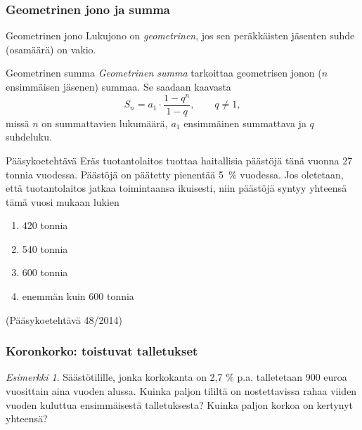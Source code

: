 \documentclass[handout]{beamer}\usepackage[]{graphicx}\usepackage[]{color}
\theoremstyle{remark}
\newtheorem{esim}{Esimerkki}
\begin{document}
\begin{frame}
    \frametitle{Geometrinen jono ja summa}
    \pause
    \begin{block}{Geometrinen jono}
        Lukujono on \emph{geometrinen}, jos sen peräkkäisten jäsenten suhde (osamäärä) on vakio.
    \end{block}
    \pause
    \begin{block}{Geometrinen summa}
        \emph{Geometrinen summa} tarkoittaa geometrisen jonon ($n$ ensimmäisen jäsenen) summaa. Se saadaan kaavasta
        \[
            S_n = a_1\cdot \frac{1-q^n}{1-q}, \qquad q\neq 1,
        \] \pause
        missä \(n\) on summattavien lukumäärä,
        \pause \(a_1\) ensimmäinen summattava
        \pause ja \(q\) suhdeluku.
    \end{block}
\end{frame}

\begin{frame}
  \begin{block}{Pääsykoetehtävä}
    Eräs tuotantolaitos tuottaa haitallisia päästöjä tänä vuonna 27 tonnia vuodessa.
Päästöjä on päätetty pienentää 5~\% vuodessa. Jos oletetaan, että tuotantolaitos jatkaa
toimintaansa ikuisesti, niin päästöjä syntyy yhteensä tämä vuosi mukaan lukien
    \begin{enumerate}
      \item 420 tonnia
      \item 540 tonnia
      \item 600 tonnia
      \item enemmän kuin 600 tonnia
    \end{enumerate}
    (Pääsykoetehtävä 48/2014)
  \end{block}
\end{frame}

\begin{frame}
\frametitle{Koronkorko: toistuvat talletukset}
	\begin{esim}
		Säästötilille, jonka korkokanta on 2,7 \% p.a. talletetaan 900 euroa vuosittain aina vuoden alussa.
		Kuinka paljon tililtä on nostettavissa rahaa viiden vuoden kuluttua ensimmäisestä talletuksesta?
		Kuinka paljon korkoa on kertynyt yhteensä?
	\end{esim}
\end{frame}
\end{document}
